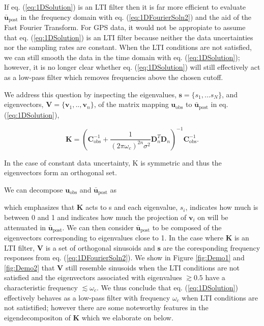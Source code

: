\documentclass[10pt,a4paper]{article}
\begin{document}
If eq. (\ref{eq:1DSolution}) is an LTI filter then it is far more efficient to evaluate $\mathbf{\bar{u}}_\mathrm{post}$ in the frequency domain with eq. (\ref{eq:1DFourierSoln2}) and the aid of the Fast Fourier Transform.  For GPS data, it would not be appropiate to assume that eq. (\ref{eq:1DSolution}) is an LTI filter because neither the data uncertainties nor the sampling rates are constant.  When the LTI conditions are not satisfied, we can still smooth the data in the time domain with eq. (\ref{eq:1DSolution}); however, it is no longer clear whether eq. (\ref{eq:1DSolution}) will still effectively act as a low-pass filter which removes frequencies above the chosen cutoff. 

We address this question by inspecting the eigenvalues, $\mathbf{s}=\{s_1,...s_N\}$, and eigenvectors, $\mathbf{V}=\{\mathbf{v}_1,..,\mathbf{v}_n\}$, of the matrix mapping $\mathbf{u}_\mathrm{obs}$ to $\mathbf{\bar{u}}_\mathrm{post}$ in eq. (\ref{eq:1DSolution}),

\begin{equation}\label{eq:Kernel}
\mathbf{K} = (\mathbf{C}_\mathrm{obs}^{-1} + 
              \frac{1}{(2\pi\omega_c)^{2n}\sigma^2}\mathbf{D}_n^T\mathbf{D}_n)^{-1}\mathbf{C}_\mathrm{obs}^{-1}.
\end{equation}

In the case of constant data uncertainty, K is symmetric and thus the eigenvectors form an orthogonal set.


We can decompose $\mathbf{u}_\mathrm{obs}$ and $\mathbf{\bar{u}}_\mathrm{post}$ as 

which emphasizes that $\mathbf{K}$ acts to s  
and each eigenvalue, $s_i$, indicates how much is between 0 and 1 and indicates how much the projection of $\mathbf{v}_i$ on will be attenuated in $\mathbf{\bar{u}}_\mathrm{post}$.  We can then consider $\mathbf{\bar{u}}_\mathrm{post}$ to be composed of the eigenvectors corresponding to eigenvalues close to 1.  In the case where $\mathbf{K}$ is an LTI filter, $\mathbf{V}$ is a set of orthogonal sinusoids and $\mathbf{s}$ are the coresponding frequency responses from eq. (\ref{eq:1DFourierSoln2}).  We show in Figure \ref{fig:Demo1} and \ref{fig:Demo2} that $\mathbf{V}$ still resemble sinusoids when the LTI conditions are not satisfied and the eigenvectors associated with eigenvalues ${\gtrsim}0.5$ have a characteristic frequency $\lesssim \omega_c$.  We thus conclude that eq. (\ref{eq:1DSolution}) effectively behaves as a low-pass filter with frequency $\omega_c$ when LTI conditions are not satistified; however there are some noteworthy features in the eigendecompositon of $\mathbf{K}$ which we elaborate on below.
\end{document}
